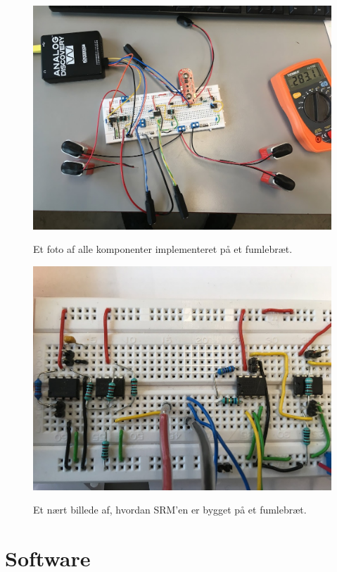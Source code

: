 \begin{figure}[H]
\centering
{\includegraphics[width=12cm]
{Figure/integrationstestBilleder1}}
\caption{Et foto af alle komponenter implementeret på et fumlebræt. }
\label{fig:integrationstestBilleder1}
\end{figure} 




\begin{figure}[H] 
\centering
{\includegraphics[width=12cm]
{Figure/aaspectrumimplementering}}
\caption{Et nært billede af, hvordan SRM'en er bygget på et fumlebræt.}
\label{aaspectrumimplementering}
\end{figure}



\pagebreak

\section{Software}

